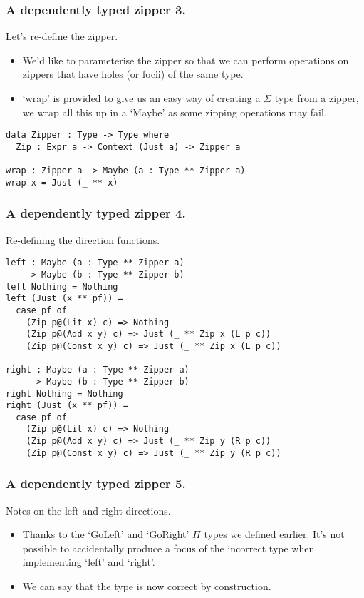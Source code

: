 \documentclass{beamer}
\begin{document}
\begin{frame}[fragile]
  \frametitle{A dependently typed zipper 3.}
  \begin{block}{Let's re-define the zipper.}
    \begin{itemize}
      \item We'd like to parameterise the zipper so that we can
        perform operations on zippers that have holes (or focii) of
        the same type.
      \item `wrap' is provided to give us an easy way of creating a
        $\Sigma$ type from a zipper, we wrap all this up in a `Maybe'
        as some zipping operations may fail.
    \end{itemize}
  \begin{verbatim}
data Zipper : Type -> Type where
  Zip : Expr a -> Context (Just a) -> Zipper a

wrap : Zipper a -> Maybe (a : Type ** Zipper a)
wrap x = Just (_ ** x)
  \end{verbatim}
  \end{block}
\end{frame}

\begin{frame}[fragile]
  \frametitle{A dependently typed zipper 4.}
  \begin{block}{Re-defining the direction functions.}
    \begin{verbatim}
left : Maybe (a : Type ** Zipper a) 
    -> Maybe (b : Type ** Zipper b)
left Nothing = Nothing
left (Just (x ** pf)) = 
  case pf of
    (Zip p@(Lit x) c) => Nothing
    (Zip p@(Add x y) c) => Just (_ ** Zip x (L p c)) 
    (Zip p@(Const x y) c) => Just (_ ** Zip x (L p c)) 

right : Maybe (a : Type ** Zipper a) 
     -> Maybe (b : Type ** Zipper b)
right Nothing = Nothing
right (Just (x ** pf)) = 
  case pf of
    (Zip p@(Lit x) c) => Nothing 
    (Zip p@(Add x y) c) => Just (_ ** Zip y (R p c)) 
    (Zip p@(Const x y) c) => Just (_ ** Zip y (R p c)) 
     \end{verbatim}
  \end{block}
\end{frame}

\begin{frame}[fragile]
  \frametitle{A dependently typed zipper 5.}
  \begin{block}{Notes on the left and right directions.}
    \begin{itemize}
      \item Thanks to the `GoLeft' and `GoRight' $\Pi$ types 
        we defined earlier. It's not possible to accidentally
        produce a focus of the incorrect type when implementing
        `left' and `right'.
      \item We can say that the type is now correct by construction.
    \end{itemize}
  \end{block}
\end{frame}
\end{document}
